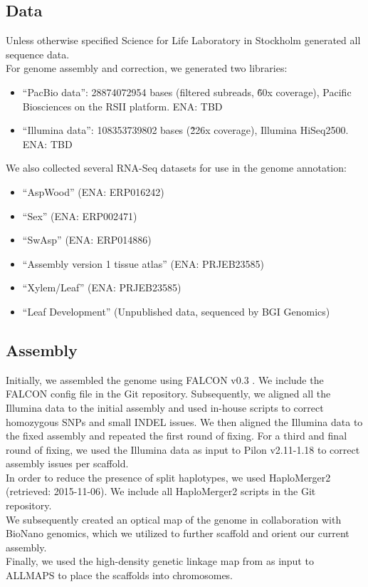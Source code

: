 \documentclass{article}
\begin{document}
\subsection{Data}
Unless otherwise specified Science for Life Laboratory in Stockholm generated all sequence data.\\
For genome assembly and correction, we generated two libraries:\\
\begin{itemize}
\item ``PacBio data'': 28874072954 bases (filtered subreads, \~60x coverage), Pacific Biosciences on the RSII platform. ENA: TBD
\item ``Illumina data'': 108353739802 bases (\~226x coverage), Illumina HiSeq2500. ENA: TBD
\end{itemize}
We also collected several RNA-Seq datasets for use in the genome annotation:\\
\begin{itemize}
\item ``AspWood'' \citep{sundell2017aspwood} (ENA: ERP016242)
\item ``Sex'' \citep{robinson2014populus} (ENA: ERP002471)
\item ``SwAsp'' \citep{mahler2017gene} (ENA: ERP014886)
\item ``Assembly version 1 tissue atlas'' \citep{LinE10970} (ENA: PRJEB23585)
\item ``Xylem/Leaf'' \citep{LinE10970} (ENA: PRJEB23585)
\item ``Leaf Development'' (Unpublished data, sequenced by BGI Genomics)
\end{itemize}

\subsection{Assembly}
Initially, we assembled the genome using FALCON v0.3 \citep{chin2016phased}. We include the FALCON config file in the Git repository. Subsequently, we aligned all the Illumina data to the initial assembly and used in-house scripts to correct homozygous SNPs and small INDEL issues. We then aligned the Illumina data to the fixed assembly and repeated the first round of fixing. For a third and final round of fixing, we used the Illumina data as input to Pilon \citep{walker2014pilon} v2.11-1.18 to correct assembly issues per scaffold.\\
In order to reduce the presence of split haplotypes, we used HaploMerger2 \citep{huang2017haplomerger2} (retrieved: 2015-11-06). We include all HaploMerger2 scripts in the Git repository.\\
We subsequently created an optical map of the genome in collaboration with BioNano genomics, which we utilized to further scaffold and orient our current assembly.\\
Finally, we used the high-density genetic linkage map from \cite{apuli2019constructing} as input to ALLMAPS \citep{tang2015allmaps} to place the scaffolds into chromosomes.\\
\end{document}
